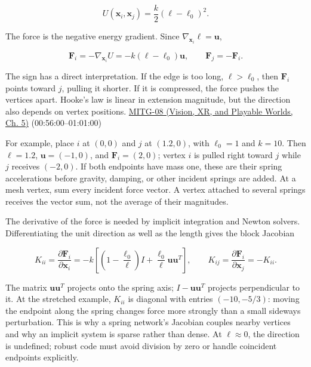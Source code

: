 \[
U(\boldsymbol{x}_i,\boldsymbol{x}_j)=\frac{k}{2}(\ell-\ell_0)^2.
\]

The force is the negative energy gradient. Since \(\nabla_{\boldsymbol{x}_i}\ell=\boldsymbol{u}\),

\[
\boldsymbol{F}_i=-\nabla_{\boldsymbol{x}_i}U
=-k(\ell-\ell_0)\boldsymbol{u},\qquad
\boldsymbol{F}_j=-\boldsymbol{F}_i.
\]

The sign has a direct interpretation. If the edge is too long, \(\ell>\ell_0\), then \(\boldsymbol{F}_i\) points toward \(j\), pulling it shorter. If it is compressed, the force pushes the vertices apart. Hooke's law is linear in extension magnitude, but the direction also depends on vertex positions. \href{../07-Vision-XR-and-Playable-Worlds/main.pdf\#nameddest=04-visual-computing-ii-ch036-mitg-08---cloth-simulation}{MITG-08 (Vision, XR, and Playable Worlds, Ch. 5)} (00:56:00--01:01:00)

For example, place \(i\) at \((0,0)\) and \(j\) at \((1.2,0)\), with \(\ell_0=1\) and \(k=10\). Then \(\ell=1.2\), \(\boldsymbol{u}=(-1,0)\), and \(\boldsymbol{F}_i=(2,0)\); vertex \(i\) is pulled right toward \(j\) while \(j\) receives \((-2,0)\). If both endpoints have mass one, these are their spring accelerations before gravity, damping, or other incident springs are added. At a mesh vertex, sum every incident force vector. A vertex attached to several springs receives the vector sum, not the average of their magnitudes.

The derivative of the force is needed by implicit integration and Newton solvers. Differentiating the unit direction as well as the length gives the block Jacobian

\[
K_{ii}=\frac{\partial\boldsymbol{F}_i}{\partial\boldsymbol{x}_i}
=-k\left[\left(1-\frac{\ell_0}{\ell}\right)I
+\frac{\ell_0}{\ell}\boldsymbol{u}\boldsymbol{u}^{T}\right],
\qquad
K_{ij}=\frac{\partial\boldsymbol{F}_i}{\partial\boldsymbol{x}_j}=-K_{ii}.
\]

The matrix \(\boldsymbol{u}\boldsymbol{u}^{T}\) projects onto the spring axis; \(I-\boldsymbol{u}\boldsymbol{u}^{T}\) projects perpendicular to it. At the stretched example, \(K_{ii}\) is diagonal with entries \((-10,-5/3)\): moving the endpoint along the spring changes force more strongly than a small sideways perturbation. This is why a spring network's Jacobian couples nearby vertices and why an implicit system is sparse rather than dense. At \(\ell\approx0\), the direction is undefined; robust code must avoid division by zero or handle coincident endpoints explicitly.

